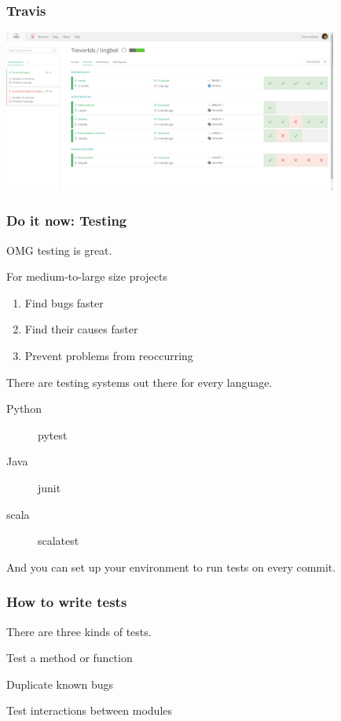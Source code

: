 \documentclass[10pt]{beamer}
\begin{document}
\begin{frame}[c]\frametitle{Travis}

\centerline{\includegraphics[width=11cm]{figs/travis.png}}

\end{frame}



\begin{frame}[c]\frametitle{Do it now: Testing}

\pause

OMG testing is great.

\pause

For medium-to-large size projects

\begin{enumerate}[<+->]
	\item Find bugs faster
	\item Find their causes faster
	\item Prevent problems from reoccurring
\end{enumerate}

\pause
There are testing systems out there for every language.

\begin{description}
	\item[Python] pytest
	\item[Java] junit
	\item[scala] scalatest
\end{description}

And you can set up your environment to run tests on every commit.

\end{frame}

\begin{frame}[c]\frametitle{How to write tests}
    There are three kinds of tests.

    \begin{description}[<+->]
    	\item[Unit tests] Test a method or function
    	\item[Regression tests] Duplicate known bugs
    	\item[Integration tests] Test interactions between modules
    \end{description}


\end{frame}
\end{document}
